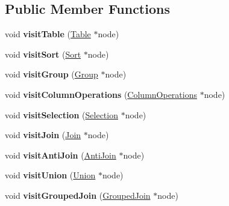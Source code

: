 \subsection*{Public Member Functions}
\begin{DoxyCompactItemize}
\item 
\hypertarget{class_algebra_compiler_a5b2f264009e5ed18fcc28c739f67d48a}{void {\bfseries visit\+Table} (\hyperlink{class_table}{Table} $\ast$node)}\label{class_algebra_compiler_a5b2f264009e5ed18fcc28c739f67d48a}

\item 
\hypertarget{class_algebra_compiler_ab0a1083d8237aeb66e2d8e3c0baff201}{void {\bfseries visit\+Sort} (\hyperlink{class_sort}{Sort} $\ast$node)}\label{class_algebra_compiler_ab0a1083d8237aeb66e2d8e3c0baff201}

\item 
\hypertarget{class_algebra_compiler_aaf1f80df836121f8f8b7abd01e7ac4dd}{void {\bfseries visit\+Group} (\hyperlink{class_group}{Group} $\ast$node)}\label{class_algebra_compiler_aaf1f80df836121f8f8b7abd01e7ac4dd}

\item 
\hypertarget{class_algebra_compiler_add29b612e4c40532405924b72f739092}{void {\bfseries visit\+Column\+Operations} (\hyperlink{class_column_operations}{Column\+Operations} $\ast$node)}\label{class_algebra_compiler_add29b612e4c40532405924b72f739092}

\item 
\hypertarget{class_algebra_compiler_a22f8846f5665f898e8f67815abe64015}{void {\bfseries visit\+Selection} (\hyperlink{class_selection}{Selection} $\ast$node)}\label{class_algebra_compiler_a22f8846f5665f898e8f67815abe64015}

\item 
\hypertarget{class_algebra_compiler_a430ba2ac25d10e94b1408e23def965e6}{void {\bfseries visit\+Join} (\hyperlink{class_join}{Join} $\ast$node)}\label{class_algebra_compiler_a430ba2ac25d10e94b1408e23def965e6}

\item 
\hypertarget{class_algebra_compiler_a4903d8f81d9da91037ce65b6aaeb7fa4}{void {\bfseries visit\+Anti\+Join} (\hyperlink{class_anti_join}{Anti\+Join} $\ast$node)}\label{class_algebra_compiler_a4903d8f81d9da91037ce65b6aaeb7fa4}

\item 
\hypertarget{class_algebra_compiler_a6c5170534fba2aa8ed5899f92ceeee8f}{void {\bfseries visit\+Union} (\hyperlink{class_union}{Union} $\ast$node)}\label{class_algebra_compiler_a6c5170534fba2aa8ed5899f92ceeee8f}

\item 
\hypertarget{class_algebra_compiler_acebcb46237fd029f910ae9d06718c1b4}{void {\bfseries visit\+Grouped\+Join} (\hyperlink{class_grouped_join}{Grouped\+Join} $\ast$node)}\label{class_algebra_compiler_acebcb46237fd029f910ae9d06718c1b4}

\end{DoxyCompactItemize}
